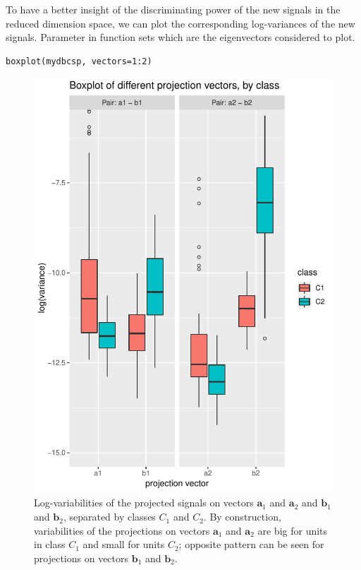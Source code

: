 To have a better insight of the discriminating power of the new signals in the reduced dimension space, we can plot the corresponding log-variances of the new signals. Parameter  in function   sets which are the eigenvectors considered to plot.



\begin{verbatim}
boxplot(mydbcsp, vectors=1:2)
\end{verbatim}

\begin{figure}
    \centering
    \includegraphics{boxplot1.pdf}
    \caption{Log-variabilities of the projected signals on vectors $\mathbf{a}_1$ and $\mathbf{a}_2$ and $\mathbf{b}_1$ and $\mathbf{b}_2$, separated by classes $C_1$ and $C_2$. By construction, variabilities of the projections on vectors $\mathbf{a}_1$ and $\mathbf{a}_2$ are big for units in class $C_1$ and small for units $C_2$; opposite pattern can be seen for projections on vectors $\mathbf{b}_1$ and $\mathbf{b}_2$.  }
    \label{fig:boxplot1}
\end{figure}

